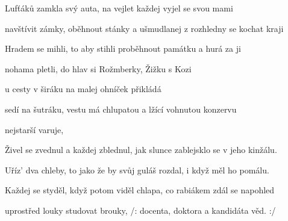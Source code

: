 

\zs
Lufťáků  zamkla svý auta, na vejlet každej vyjel se svou mami

navštívit zámky, oběhnout stánky a ušmudlanej z rozhledny se kochat kraji

Hradem se mihli, to aby stihli proběhnout památku a hurá za ji

nohama pletli, do hlav si   Rožmberky, Žižku s Kozi
\ks

\zr
{} u cesty v širáku na malej ohníček přikládá 

sedí na šutráku, vestu má chlupatou a lžící vohnutou konzervu 

 nejstarší varuje, 
\kr

\zs
Živel se zvednul a každej zblednul, jak slunce zablejsklo se v jeho kinžálu.

Uříz' dva chleby, to jako že by svůj guláš rozdal, i když měl ho pomálu.

Každej se styděl, když potom viděl chlapa, co rabiákem zdál se napohled

uprostřed louky studovat brouky, /: docenta, doktora a kandidáta věd. :/
\ks

\kp
